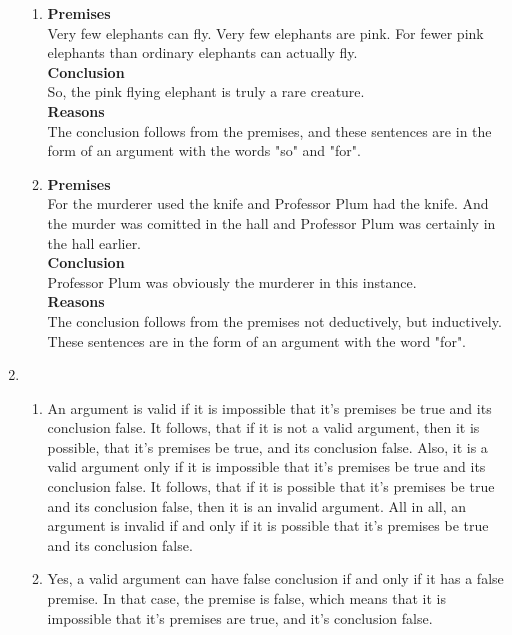 \documentclass[a4paper,12pt]{article}
\begin{document}
\begin{enumerate}[label=\arabic*,leftmargin=*]
\begin{enumerate}[label=\Alph*]
                \item \textbf{Premises}\\
                    Very few elephants can fly. Very few elephants are pink. For fewer pink elephants than ordinary elephants can actually fly.\\
                    \textbf{Conclusion}\\
                    So, the pink flying elephant is truly a rare creature.\\
                    \textbf{Reasons}\\
                    The conclusion follows from the premises, and these sentences are in the form of an argument with the words "so" and "for".

                \item \textbf{Premises}\\
                     For the murderer used the knife and Professor Plum had the knife. And the murder was comitted in the hall and Professor Plum was certainly in the hall earlier.\\
                    \textbf{Conclusion}\\
                    Professor Plum was obviously the murderer in this instance.\\
                    \textbf{Reasons}\\
                    The conclusion follows from the premises not deductively, but inductively. These sentences are in the form of an argument with the word "for".

            \end{enumerate}

        \item
            \nopagebreak
            \begin{enumerate}[label=\Alph*]
                \item An argument is valid if it is impossible that it's premises be true and its conclusion false. It follows, that if it is not a valid argument, then it is possible, that it's premises be true, and its conclusion false. Also, it is a valid argument only if it is impossible that it's premises be true and its conclusion false. It follows, that if it is possible that it's premises be true and its conclusion false, then it is an invalid argument. All in all, an argument is invalid if and only if it is possible that it's premises be true and its conclusion false.

                \item Yes, a valid argument can have false conclusion if and only if it has a false premise. In that case, the premise is false, which means that it is impossible that it's premises are true, and it's conclusion false.


\end{enumerate}
\end{enumerate}
\end{document}
